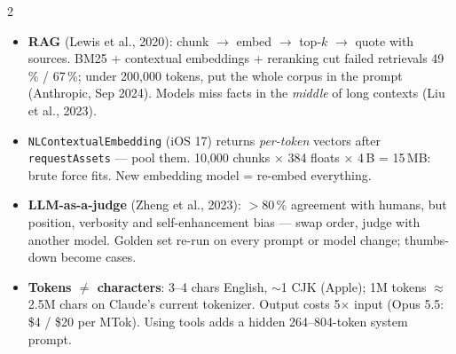 \documentclass[8pt]{extarticle}
\newcommand\ct[1]{\texttt{#1}}
\newcommand\hd[1]{\par\vspace{3pt}\noindent{\bfseries\color{sheetBlue}#1}\par\vspace{1pt}}
\begin{document}
\begin{multicols}{2}
\hd{RAG, evals, cost}
\begin{itemize}
  \item \textbf{RAG} (Lewis et al., 2020): chunk $\to$ embed $\to$ top-$k$ $\to$ quote with
        sources. BM25 + contextual embeddings + reranking cut failed retrievals 49\,\% / 67\,\%;
        under 200,000 tokens, put the whole corpus in the prompt (Anthropic, Sep 2024). Models
        miss facts in the \emph{middle} of long contexts (Liu et al., 2023).
  \item \ct{NLContextualEmbedding} (iOS 17) returns \emph{per-token} vectors after
        \ct{requestAssets} — pool them. 10,000 chunks × 384 floats × 4\,B = 15\,MB: brute force
        fits. New embedding model = re-embed everything.
  \item \textbf{LLM-as-a-judge} (Zheng et al., 2023): $>$80\,\% agreement with humans, but
        position, verbosity and self-enhancement bias — swap order, judge with another model.
        Golden set re-run on every prompt or model change; thumbs-down become cases.
  \item \textbf{Tokens $\ne$ characters}: 3–4 chars English, $\sim$1 CJK (Apple); 1M tokens
        $\approx$ 2.5M chars on Claude's current tokenizer. Output costs 5$\times$ input (Opus 5.5:
        \$4 / \$20 per MTok). Using tools adds a hidden 264–804-token system prompt.
\end{itemize}

\end{multicols}

\end{document}
